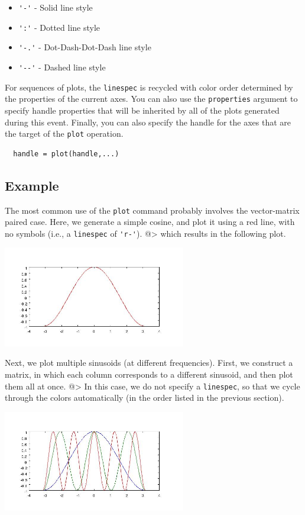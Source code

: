 \begin{itemize}
\item  \verb|'-'| - Solid line style

\item  \verb|':'| - Dotted line style

\item  \verb|'-.'| - Dot-Dash-Dot-Dash line style

\item  \verb|'--'| - Dashed line style

\end{itemize}
For sequences of plots, the \verb|linespec| is recycled with color order determined
by the properties of the current axes.  You can also use the \verb|properties|
argument to specify handle properties that will be inherited by all of the plots
generated during this event.  Finally, you can also specify the handle for the
axes that are the target of the \verb|plot| operation.
\begin{verbatim}
  handle = plot(handle,...)
\end{verbatim}
\subsection{Example}

The most common use of the \verb|plot| command probably involves the vector-matrix
paired case.  Here, we generate a simple cosine, and plot it using a red line, with
no symbols (i.e., a \verb|linespec| of \verb|'r-'|).
@>
which results in the following plot.


\centerline{\includegraphics[width=8cm]{plot1}}


Next, we plot multiple sinusoids (at different frequencies).  First, we construct
a matrix, in which each column corresponds to a different sinusoid, and then plot
them all at once.
@>
In this case, we do not specify a \verb|linespec|, so that we cycle through the
colors automatically (in the order listed in the previous section).


\centerline{\includegraphics[width=8cm]{plot2}}


